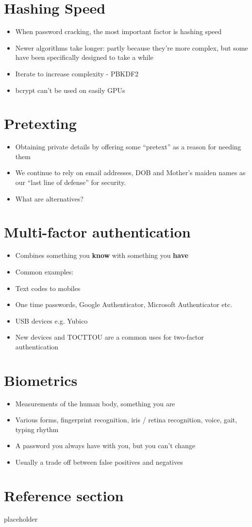 \documentclass{article}
\begin{document}
\section{Hashing Speed}
\begin{itemize}
  \item When password cracking, the most important factor is hashing speed 
  \item Newer algorithms take longer: partly because they’re more complex, but some have been specifically designed to take a while 
  \item Iterate to increase complexity - PBKDF2 
  \item bcrypt can’t be used on easily GPUs
\end{itemize}

\section{Pretexting}
\begin{itemize}
  \item Obtaining private details by offering some “pretext” as a reason for needing them 
  \item We continue to rely on email addresses, DOB and Mother’s maiden names as our “last line of defense” for security.
  \item What are alternatives?
\end{itemize}

\section{Multi-factor authentication}  
\begin{itemize}
  \item Combines something you \textbf{know} with something you \textbf{have} 
  \item Common examples: 
  \item Text codes to mobiles 
  \item One time passwords, Google Authenticator, Microsoft Authenticator etc. 
  \item USB devices e.g. Yubico 
  \item New devices and TOCTTOU are a common uses for two-factor authentication
\end{itemize}

\section{Biometrics}
\begin{itemize}
  \item Measurements of the human body, something you are 
  \item Various forms, fingerprint recognition, iris / retina recognition, voice, gait, typing rhythm 
  \item A password you always have with you, but you can’t change 
  \item Usually a trade off between false positives and negatives
\end{itemize}

\pagebreak
\section*{Reference section} \label{sec:reference}
\begin{description}
	\item[placeholder] \hfill \\
\end{description}
\end{document}
